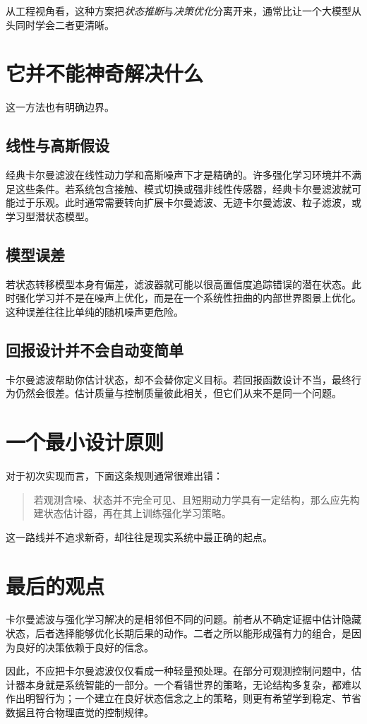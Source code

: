 \documentclass[12pt,a4paper]{ctexart}
\begin{document}
从工程视角看，这种方案把\emph{状态推断}与\emph{决策优化}分离开来，通常比让一个大模型从头同时学会二者更清晰。

\section{它并不能神奇解决什么}

这一方法也有明确边界。

\subsection{线性与高斯假设}

经典卡尔曼滤波在线性动力学和高斯噪声下才是精确的。许多强化学习环境并不满足这些条件。若系统包含接触、模式切换或强非线性传感器，经典卡尔曼滤波就可能过于乐观。此时通常需要转向扩展卡尔曼滤波、无迹卡尔曼滤波、粒子滤波，或学习型潜状态模型。

\subsection{模型误差}

若状态转移模型本身有偏差，滤波器就可能以很高置信度追踪错误的潜在状态。此时强化学习并不是在噪声上优化，而是在一个系统性扭曲的内部世界图景上优化。这种误差往往比单纯的随机噪声更危险。

\subsection{回报设计并不会自动变简单}

卡尔曼滤波帮助你估计状态，却不会替你定义目标。若回报函数设计不当，最终行为仍然会很差。估计质量与控制质量彼此相关，但它们从来不是同一个问题。

\section{一个最小设计原则}

对于初次实现而言，下面这条规则通常很难出错：

\begin{quote}
若观测含噪、状态并不完全可见、且短期动力学具有一定结构，那么应先构建状态估计器，再在其上训练强化学习策略。
\end{quote}

这一路线并不追求新奇，却往往是现实系统中最正确的起点。

\section{最后的观点}

卡尔曼滤波与强化学习解决的是相邻但不同的问题。前者从不确定证据中估计隐藏状态，后者选择能够优化长期后果的动作。二者之所以能形成强有力的组合，是因为良好的决策依赖于良好的信念。

因此，不应把卡尔曼滤波仅仅看成一种轻量预处理。在部分可观测控制问题中，估计器本身就是系统智能的一部分。一个看错世界的策略，无论结构多复杂，都难以作出明智行为；一个建立在良好状态信念之上的策略，则更有希望学到稳定、节省数据且符合物理直觉的控制规律。
\end{document}
